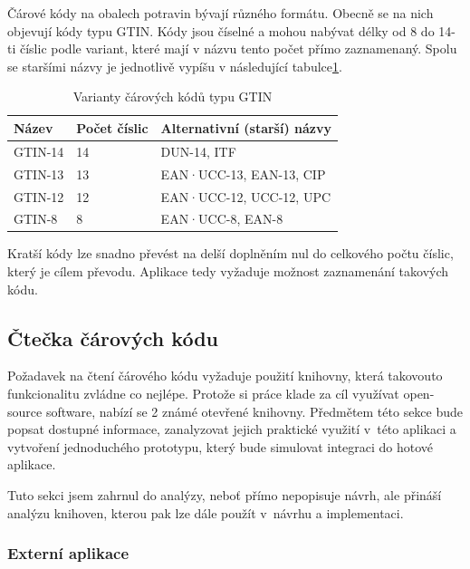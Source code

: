 \documentclass[thesis=B,czech]{FITthesis}[2013/10/20]
\begin{document}
Čárové kódy na obalech potravin bývají různého formátu. Obecně se na nich objevují kódy typu GTIN. Kódy jsou číselné a mohou nabývat délky od 8 do 14-ti číslic podle variant, které mají v názvu tento počet přímo zaznamenaný. Spolu se staršími názvy je jednotlivě vypíšu v následující tabulce\ref{table:carkod}.
\begin{table}[h]
      \begin{tabular}{|l|l|l|}
      \hline
      Název   & Počet číslic & Alternativní (starší) názvy \\ \hline
      GTIN-14 & 14           & DUN-14, ITF                 \\ \hline
      GTIN-13 & 13           & EAN·UCC-13, EAN-13, CIP     \\ \hline
      GTIN-12 & 12           & EAN·UCC-12, UCC-12, UPC     \\ \hline
      GTIN-8  & 8            & EAN·UCC-8, EAN-8            \\ \hline
      \end{tabular}
      \caption{Varianty čárových kódů typu GTIN}
      \label{table:carkod}
\end{table}
Kratší kódy lze snadno převést na delší doplněním nul do celkového počtu číslic, který je cílem převodu. Aplikace tedy vyžaduje možnost zaznamenání takových kódu.

\subsection{Čtečka čárových kódu}

Požadavek na čtení čárového kódu vyžaduje použití knihovny, která takovouto funkcionalitu zvládne co nejlépe. Protože si práce klade za cíl využívat open-source software, nabízí se 2 známé otevřené knihovny. Předmětem této sekce bude popsat dostupné informace, zanalyzovat jejich praktické využití v~této aplikaci a vytvoření jednoduchého prototypu, který bude simulovat integraci do hotové aplikace.

Tuto sekci jsem zahrnul do analýzy, neboť přímo nepopisuje návrh, ale přináší analýzu knihoven, kterou pak lze dále použít v~návrhu a implementaci.

\subsubsection{Externí aplikace}
\end{document}
